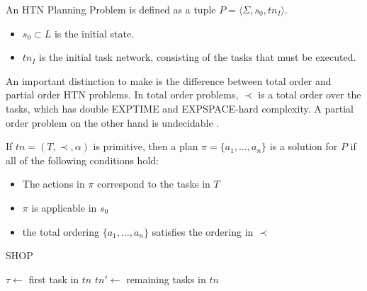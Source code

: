 \begin{definition}
  An HTN Planning Problem is defined as a tuple $P=\langle \Sigma, s_0, tn_I \rangle$.
  \begin{itemize}
    \item $s_0 \subset L$ is the initial state.
    \item $tn_I$ is the initial task network, consisting of the tasks that must be executed.
  \end{itemize}
\end{definition}



An important distinction to make is the difference between total order and partial order HTN problems.
In total order problems, $\prec$ is a total order over the tasks, which has double EXPTIME and EXPSPACE-hard complexity.
A partial order problem on the other hand is undecidable \citep{erolHTNPlanningComplexity1994}.


\begin{definition}
  If $tn = (T,\prec,\alpha)$ is primitive, then a plan $\pi = \{a_1,\dots,a_n\}$ is a solution for $P$ if all of the following conditions hold:
  \begin{itemize}
    \item The actions in $\pi$ correspond to the tasks in $T$
    \item $\pi$ is applicable in $s_0$
    \item the total ordering $\{a_1,\dots,a_n\}$ satisfies the ordering in $\prec$
  \end{itemize}
  \label{def:htn-sol}
\end{definition}

\begin{algorithm}
  \caption{SHOP}
  \label{alg:background:shop}
  \KwOut{$\pi$}
  $\tau \leftarrow$ first task in $tn$\;
  $tn' \leftarrow$ remaining tasks in $tn$\;
\end{algorithm}

